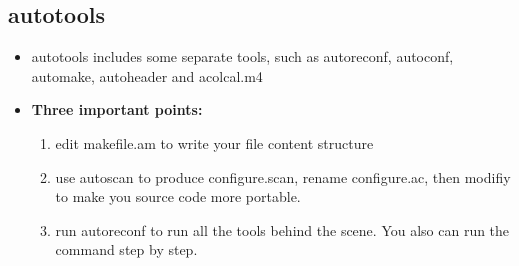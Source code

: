 \documentclass[a4paper,11pt,twoside]{book}
\begin{document}
\subsection{autotools}
\begin{itemize}
		\item autotools includes some separate tools, such as autoreconf, autoconf, automake, autoheader and acolcal.m4 
		
		\item \textbf{Three important points:}
				\begin{enumerate}
						\item edit makefile.am to write your file content structure
						\item use autoscan to produce configure.scan, rename configure.ac, then modifiy to make you source code more portable. 
						
						\item run autoreconf to run all the tools behind the scene. You also can run the command step by step.
				\end{enumerate}
		

\end{itemize}
\end{document}

